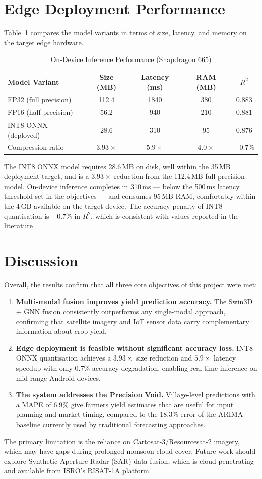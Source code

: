 \section{Edge Deployment Performance}

Table~\ref{tab:compression_r} compares the model variants in terms of size, latency, and memory on the target edge hardware.

\begin{table}[h]
\centering
\caption{On-Device Inference Performance (Snapdragon 665)}
\label{tab:compression_r}
\begin{tabular}{|l|c|c|c|c|}
\hline
\textbf{Model Variant} & \textbf{Size (MB)} & \textbf{Latency (ms)} & \textbf{RAM (MB)} & \textbf{$R^2$} \\
\hline
FP32 (full precision) & 112.4 & 1840 & 380 & 0.883 \\
FP16 (half precision) &  56.2 &  940 & 210 & 0.881 \\
INT8 ONNX (deployed)  &  28.6 &  310 &  95 & 0.876 \\
\hline
Compression ratio     & $3.93\times$ & $5.9\times$ & $4.0\times$ & $-0.7\%$ \\
\hline
\end{tabular}
\end{table}

The INT8 ONNX model requires 28.6\,MB on disk, well within the 35\,MB deployment target, and is a $3.93\times$ reduction from the 112.4\,MB full-precision model. On-device inference completes in 310\,ms --- below the 500\,ms latency threshold set in the objectives --- and consumes 95\,MB RAM, comfortably within the 4\,GB available on the target device. The accuracy penalty of INT8 quantisation is $-0.7\%$ in $R^2$, which is consistent with values reported in the literature \cite{han2016deep}.

\section{Discussion}

Overall, the results confirm that all three core objectives of this project were met:

\begin{enumerate}
    \item \textbf{Multi-modal fusion improves yield prediction accuracy.} The Swin3D + GNN fusion consistently outperforms any single-modal approach, confirming that satellite imagery and IoT sensor data carry complementary information about crop yield.
    \item \textbf{Edge deployment is feasible without significant accuracy loss.} INT8 ONNX quantisation achieves a $3.93\times$ size reduction and $5.9\times$ latency speedup with only $0.7\%$ accuracy degradation, enabling real-time inference on mid-range Android devices.
    \item \textbf{The system addresses the Precision Void.} Village-level predictions with a MAPE of 6.9\% give farmers yield estimates that are useful for input planning and market timing, compared to the 18.3\% error of the ARIMA baseline currently used by traditional forecasting approaches.
\end{enumerate}

The primary limitation is the reliance on Cartosat-3/Resourcesat-2 imagery, which may have gaps during prolonged monsoon cloud cover. Future work should explore Synthetic Aperture Radar (SAR) data fusion, which is cloud-penetrating and available from ISRO's RISAT-1A platform.
